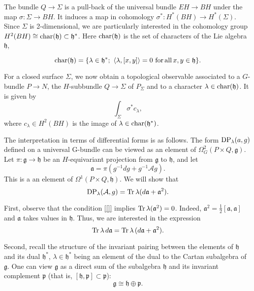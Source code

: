 \documentclass[11pt]{report}
\theoremstyle{plain}
\theoremstyle{definition}
\theoremstyle{remark}
\theoremstyle{remark}
\numberwithin{equation}{section}
\begin{document}
The bundle $Q \to \Sigma$ is a pull-back of the universal bundle $EH\to BH$ under the map $\sigma: \Sigma \to BH$.
It induces a map in cohomology $\sigma^*: H^*(BH) \to H^*(\Sigma)$. Since $\Sigma$ is 2-dimensional, we are particularly interested in the cohomology group $H^2(BH) \cong {\rm char}(\mathfrak{h}) \subset \mathfrak{h}^*$. Here ${\rm char}(\mathfrak{h})$ is the set of characters of the Lie algebra $\mathfrak{h}$,

\begin{equation} \label{[]}
{\rm char}(\mathfrak{h})=\{ \lambda \in \mathfrak{h}^*; \,\,  \langle \lambda, [x,y] \rangle =0 \,\,  {\rm for \, all} \, x,y \in \mathfrak{h} \} .
\end{equation}

For a closed surface $\Sigma$, we now obtain a topological observable associated  to a $G$-bundle
$P \to N$, the $H$-subbundle $Q \to \Sigma$ of $P_\Sigma$ and to a character $\lambda \in {\rm char}(\mathfrak{h})$. 
It is given by
%
$$
\int_\Sigma \sigma^* c_\lambda,
$$
where $c_\lambda \in H^2(BH)$ is the image of  $\lambda \in {\rm char}(\mathfrak{h}^*)$.

The interpretation in terms of differential forms is as follows. The form ${\rm DP}_\lambda(a,g)$ defined on a universal G-bundle can be viewed as an element of $\Omega_G^2(P \times Q , \mathfrak{g})$. Let $\pi: \mathfrak{g} \to \mathfrak{h}$ be an $H$-equivariant projection from $\mathfrak{g}$ to $\mathfrak{h}$, and let
%
$$
\mathfrak{a} = \pi(g^{-1} dg + g^{-1} \mathcal{A} g).
$$
This is a an element of $\Omega^1(P \times Q, \mathfrak{h})$. We will show that
%
$$
{\rm DP}_\lambda(\mathcal{A},g) = {\rm Tr}\, \lambda (d\mathfrak{a} + \mathfrak{a}^2).
$$

First, observe that the condition \eqref{[]} implies ${\rm Tr} \, \lambda (\mathfrak{a}^2) = 0$. Indeed,  $\mathfrak{a}^2 = \frac{1}{2} [\mathfrak{a},\mathfrak{a}]$ and $\mathfrak{a}$ takes values in $\mathfrak{h}$. Thus, we are interested in the expression 
$${\rm Tr} \, \lambda \, d\mathfrak{a} = {\rm Tr} \, \lambda\, (d\mathfrak{a} + \mathfrak{a}^2).$$


Second, recall the structure of the invariant pairing between the elements of $\mathfrak{h}$ and its dual $\mathfrak{h}^*$, $\lambda \in \mathfrak{h}^*$ being an element of the dual to the Cartan subalgebra of $\mathfrak{g}$. One can view $\mathfrak{g}$ as a direct sum of the subalgebra $\mathfrak{h}$ and its invariant complement $\mathfrak{p}$ (that is,
$[\mathfrak{h}, \mathfrak{p}] \subset \mathfrak{p}$):
$$\mathfrak{g} \cong \mathfrak{h} \oplus \mathfrak{p}.$$
\end{document}
